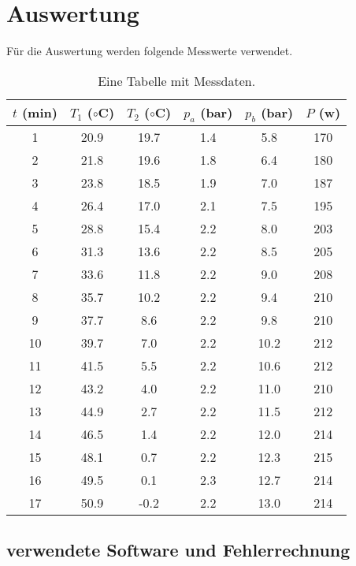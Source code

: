 \section{Auswertung}
\label{sec:Auswertung}

Für die Auswertung werden folgende Messwerte verwendet.

\begin{table}
  \centering
  \caption{Eine Tabelle mit Messdaten.}
  \label{tab:some_data}
  \begin{tabular}{c c c c c c}
    \toprule
    $t$ (min) & $T_1$ ($\circ$C) & $T_2$ ($\circ$C) & $p_a$ (bar) & $p_b$ (bar) & $P$ (w) \\
    \midrule
     1 & 20.9 & 19.7 & 1.4 &  5.8 & 170 \\
     2 & 21.8 & 19.6 & 1.8 &  6.4 & 180 \\
     3 & 23.8 & 18.5 & 1.9 &  7.0 & 187 \\
     4 & 26.4 & 17.0 & 2.1 &  7.5 & 195 \\
     5 & 28.8 & 15.4 & 2.2 &  8.0 & 203 \\
     6 & 31.3 & 13.6 & 2.2 &  8.5 & 205 \\
     7 & 33.6 & 11.8 & 2.2 &  9.0 & 208 \\
     8 & 35.7 & 10.2 & 2.2 &  9.4 & 210 \\
     9 & 37.7 &  8.6 & 2.2 &  9.8 & 210 \\
    10 & 39.7 &  7.0 & 2.2 & 10.2 & 212 \\
    11 & 41.5 &  5.5 & 2.2 & 10.6 & 212 \\
    12 & 43.2 &  4.0 & 2.2 & 11.0 & 210 \\
    13 & 44.9 &  2.7 & 2.2 & 11.5 & 212 \\
    14 & 46.5 &  1.4 & 2.2 & 12.0 & 214 \\
    15 & 48.1 &  0.7 & 2.2 & 12.3 & 215 \\
    16 & 49.5 &  0.1 & 2.3 & 12.7 & 214 \\
    17 & 50.9 & -0.2 & 2.2 & 13.0 & 214 \\
    \bottomrule
  \end{tabular}
\end{table}

\subsection{verwendete Software und Fehlerrechnung}
\label{sec:SoftwareFehlerrechnung}

